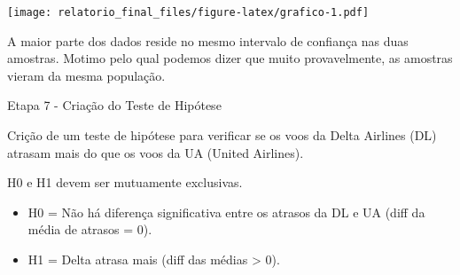 \documentclass[]{article}
\newenvironment{Shaded}{\begin{snugshade}}{\end{snugshade}}
\newcommand{\DataTypeTok}[1]{\textcolor[rgb]{0.13,0.29,0.53}{#1}}
\newcommand{\DecValTok}[1]{\textcolor[rgb]{0.00,0.00,0.81}{#1}}
\newcommand{\KeywordTok}[1]{\textcolor[rgb]{0.13,0.29,0.53}{\textbf{#1}}}
\newcommand{\NormalTok}[1]{#1}
\newcommand{\OperatorTok}[1]{\textcolor[rgb]{0.81,0.36,0.00}{\textbf{#1}}}
\newcommand{\StringTok}[1]{\textcolor[rgb]{0.31,0.60,0.02}{#1}}
\providecommand{\tightlist}{%
  \setlength{\itemsep}{0pt}\setlength{\parskip}{0pt}}
\begin{document}
\begin{Shaded}
\end{Shaded}

\texttt{[image: relatorio\_final\_files/figure-latex/grafico-1.pdf]}

A maior parte dos dados reside no mesmo intervalo de confiança nas duas
amostras. Motimo pelo qual podemos dizer que muito provavelmente, as
amostras vieram da mesma população.

Etapa 7 - Criação do Teste de Hipótese

Crição de um teste de hipótese para verificar se os voos da Delta
Airlines (DL) atrasam mais do que os voos da UA (United Airlines).

H0 e H1 devem ser mutuamente exclusivas.

\begin{itemize}
\tightlist
\item
  H0 = Não há diferença significativa entre os atrasos da DL e UA (diff
  da média de atrasos = 0).
\item
  H1 = Delta atrasa mais (diff das médias \textgreater{} 0).
\end{itemize}
\end{document}
